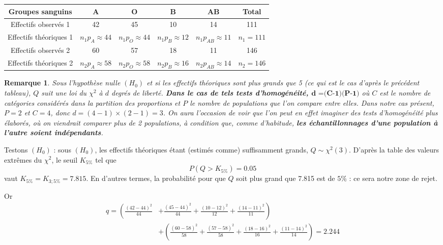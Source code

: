 \documentclass[a4paper,oneside,12pt]{article}
\theoremstyle{plain}
\newtheorem*{remark}{Remarque}
\begin{document}
\begin{enumerate}
    \begin{table}[h]
        \centering
        \begin{tabular}{|c|c|c|c|c|c|}
            \hline
            Groupes sanguins & A & O & B & AB & Total \\
            \hline
            Effectifs observés 1 & 42 & 45 & 10 & 14 & 111\\
            \hline
            Effectifs théoriques 1 & $n_1p_A \approx 44$ & $n_1p_O \approx 44$ & $n_1p_B \approx 12$ & $n_1p_{AB} \approx 11$ & $n_1 = 111$\\
            \hline
            Effectifs observés 2 & 60 & 57 & 18 & 11 & 146\\
            \hline
            Effectifs théoriques 2 & $n_2p_A \approx 58$ & $n_2p_O \approx 58$ & $n_2p_B \approx 16$ & $n_2p_{AB} \approx 14$ & $n_2 = 146$\\
            \hline
\end{tabular}
    \end{table}
\begin{remark}
        Sous l'hypothèse nulle $(H_0)$ et si les effectifs théoriques sont plus grands que 5 (ce qui est le cas d'après le précédent tableau), $Q$ suit une loi du $\chi^2$ à $d$ degrés de liberté. \textbf{Dans le cas de tels tests d'homogénéité, $\textbf{d =(C-1)(P-1)}$} où $C$ est le nombre de catégories considérés dans la partition des proportions et $P$ le nombre de populations que l'on compare entre elles. Dans notre cas présent, $P=2$ et $C=4$, donc $d =(4-1)\times(2-1) =3$. On aura l'occasion de voir que l'on peut en effet imaginer des tests d'homogénéité plus élaborés, où on viendrait comparer plus de 2 populations, à condition que, comme d'habitude, \textbf{les échantillonnages d'une population à l'autre soient indépendants}.
    \end{remark}

    Testons $(H_0)$ : sous $(H_0)$, les effectifs théoriques étant (estimés comme) suffisamment grands, $Q \sim \chi^2(3)$. D'après la table des valeurs extrêmes du $\chi^2$, le seuil $K_{5\%}$ tel que $$P(Q>K_{5\%}) = 0.05$$ vaut $K_{5\%}=K_{3;5\%} =7.815$. En d'autres termes, la probabilité pour que $Q$ soit plus grand que 7.815 est de $5\%$ : ce sera notre zone de rejet.

    Or 
    \begin{align*}
        q = \left ( \frac{(42-44)^2}{44} \right. & +\left. \frac{(45-44)^2}{44}+\frac{(10-12)^2}{12}+\frac{(14-11)^2}{11} \right ) \\
        & + \left(\frac{(60-58)^2}{58}+\frac{(57-58)^2}{58}+\frac{(18-16)^2}{16}+\frac{(11-14)^2}{14}\right) = 2.244\\
    \end{align*}


\end{enumerate}
\end{document}
